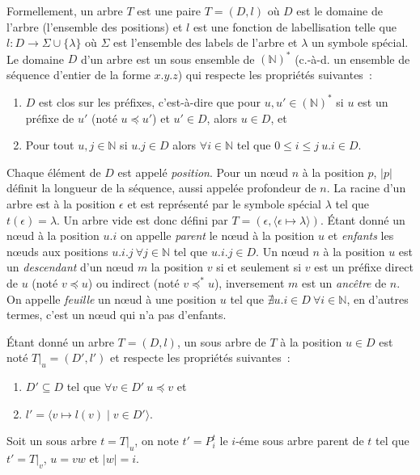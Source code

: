 \begin{definition}
    Formellement, un arbre $T$ est une paire $T = (D, l)$ où $D$ est le domaine de l'arbre (l'ensemble des positions) et $l$ est une fonction de labellisation telle que $l : D \to \Sigma \cup \{\lambda\}$ où $\Sigma$ est l'ensemble des labels de l'arbre et $\lambda$ un symbole spécial.
    Le domaine $D$ d'un arbre est un sous ensemble de $(\mathbb{N})^*$ (c.-à-d. un ensemble de séquence d'entier de la forme $x.y.z$) qui respecte les propriétés suivantes :
    \begin{enumerate}
        \item $D$ est clos sur les préfixes, c'est-à-dire que pour $u, u' \in (\mathbb{N})^*$ si $u$ est un préfixe de $u'$ (noté $u \preceq u'$) et $u' \in D$, alors $u \in D$, et
        \item Pour tout $u, j \in \mathbb{N}$ si $u.j \in D$ alors $\forall i \in \mathbb{N}$ tel que $0 \leq i \leq j ~ u.i \in D$.
    \end{enumerate}
    Chaque élément de $D$ est appelé \emph{position}.
    Pour un nœud $n$ à la position $p$, $|p|$ définit la longueur de la séquence, aussi appelée profondeur de $n$.
    La racine d'un arbre est à la position $\epsilon$ et est représenté par le symbole spécial $\lambda$ tel que $t(\epsilon) = \lambda$.
    Un arbre vide est donc défini par  $T = (\epsilon, \langle \epsilon \mapsto \lambda \rangle)$.
    Étant donné un nœud à la position $u.i$ on appelle \emph{parent} le nœud à la position $u$ et \emph {enfants} les nœuds aux positions $u.i.j ~ \forall j \in \mathbb{N}$ tel que $u.i.j \in D$.
    Un nœud $n$ à la position $u$ est un \emph{descendant} d'un nœud $m$ la position $v$ si et seulement si $v$ est un préfixe direct de $u$ (noté $v \preceq u$) ou indirect (noté $v \preceq^* u$), inversement $m$ est un \emph{ancêtre} de $n$.
    On appelle \emph{feuille} un nœud à une position $u$ tel que $\nexists u.i \in D ~ \forall i \in \mathbb{N}$, en d'autres termes, c'est un nœud qui n'a pas d'enfants.
\end{definition}

\begin{definition}
    Étant donné un arbre $T = (D, l)$, un sous arbre de $T$ à la position $u \in D$ est noté $T|_u = (D', l')$ et respecte les propriétés suivantes :
    \begin{enumerate}
        \item $D' \subseteq D$ tel que $\forall v \in D' ~ u \preceq v$ et
        \item $l' = \langle v \mapsto l(v) \mid v \in D' \rangle $.
    \end{enumerate}
    Soit un sous arbre $t = T|_u$, on note $t' = P_i^t$ le $i$-éme sous arbre parent de $t$ tel que $t' = T|_v$,  $u = vw$ et $|w| = i$.
\end{definition}

